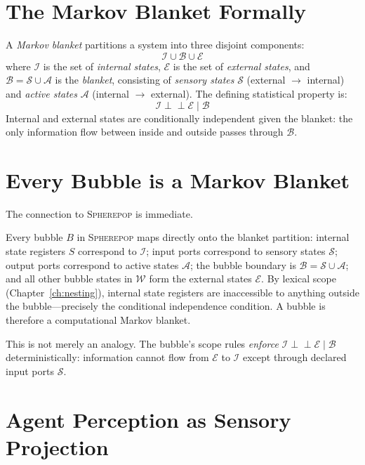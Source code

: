 \documentclass[11pt,a4paper,openany]{book}
\theoremstyle{plain}
\theoremstyle{definition}
\theoremstyle{remark}
\newenvironment{defbox}[1]{%
  \begin{tcolorbox}[
    title={\textbf{Definition:} #1},
    colback=defbg,
    colframe=sphereamber!80,
    fonttitle=\bfseries,
    coltitle=sphereamber!60!black,
    sharp corners,
    breakable,
    before upper={\normalfont\setlength{\parindent}{0pt}\tolerance=9999\hbadness=9999}
  ]
}{\end{tcolorbox}}
\newenvironment{mechanic}[1]{%
  \begin{tcolorbox}[
    title={\textbf{World Mechanic:} #1},
    colback=sphereteal!5,
    colframe=sphereteal,
    fonttitle=\bfseries\color{white},
    coltitle=white,
    sharp corners,
    breakable,
    before upper={\normalfont\setlength{\parindent}{0pt}\tolerance=9999\hbadness=9999}
  ]
}{\end{tcolorbox}}
\newcommand{\Sp}{\textsc{Spherepop}\xspace}
\newcommand{\world}{\ensuremath{\mathcal{W}}}
\begin{document}
\section{The Markov Blanket Formally}

\begin{defbox}{Markov Blanket}
  A \emph{Markov blanket} partitions a system into three disjoint
  components:
  \[
    \mathcal{I} \cup \mathcal{B} \cup \mathcal{E}
  \]
  where $\mathcal{I}$ is the set of \emph{internal states},
  $\mathcal{E}$ is the set of \emph{external states}, and
  $\mathcal{B} = \mathcal{S} \cup \mathcal{A}$ is the \emph{blanket},
  consisting of \emph{sensory states} $\mathcal{S}$ (external $\to$
  internal) and \emph{active states} $\mathcal{A}$ (internal $\to$
  external). The defining statistical property is:
  \[
    \mathcal{I} \perp\!\!\!\perp \mathcal{E} \;\big|\; \mathcal{B}
  \]
  Internal and external states are conditionally independent given the
  blanket: the only information flow between inside and outside passes
  through $\mathcal{B}$.
\end{defbox}

\section{Every Bubble is a Markov Blanket}

The connection to \Sp{} is immediate.

\begin{mechanic}{Bubble as Markov Blanket}
  Every bubble $B$ in \Sp{} maps directly onto the blanket partition:
  internal state registers $S$ correspond to $\mathcal{I}$;
  input ports correspond to sensory states $\mathcal{S}$;
  output ports correspond to active states $\mathcal{A}$;
  the bubble boundary is $\mathcal{B} = \mathcal{S} \cup \mathcal{A}$;
  and all other bubble states in $\world$ form the external states $\mathcal{E}$.
  By lexical scope (Chapter~\ref{ch:nesting}), internal state registers
  are inaccessible to anything outside the bubble---precisely the
  conditional independence condition. A bubble is therefore a computational
  Markov blanket.
\end{mechanic}

This is not merely an analogy. The bubble's scope rules \emph{enforce}
$\mathcal{I} \perp\!\!\!\perp \mathcal{E} \mid \mathcal{B}$ deterministically:
information cannot flow from $\mathcal{E}$ to $\mathcal{I}$ except through
declared input ports $\mathcal{S}$.

\section{Agent Perception as Sensory Projection}
\end{document}
